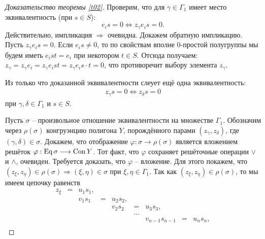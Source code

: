 \documentclass[a4paper]{article}
\newcommand{\Con}{\textnormal{Con}\, }
\newcommand{\Eq}{\textnormal{Eq}\, }
\begin{document}
\begin{proof}[Доказательство теоремы \ref{t02}]
		\par Проверим, что для $\gamma \in \Gamma_1$ имеет место эквивалентность (при $s \in S$): $$ e_i s = 0 \Leftrightarrow z_\gamma e_is = 0. $$ Действительно, импликация $ \Rightarrow $ очевидна. Докажем обратную импликацию. Пусть $z_\gamma e_is = 0$. Если $e_is \neq 0$, то по свойствам вполне 0-простой полугруппы мы будем иметь $e_i st = e_i$ при некотором $t \in S$. Отсюда получаем: $z_\gamma = z_\gamma e_i = z_\gamma e_ist = z_\gamma e_is \cdot t = 0$, что противоречит выбору элемента $z_\gamma$.
		\par Из только что доказанной эквивалентности слеует ещё одна эквивалентность:
		\begin{gather}
			z_\gamma s = 0 \Leftrightarrow z_\delta s = 0 \label{lf1}
		\end{gather}
		при $\gamma,\delta \in \Gamma_1$ и $s \in S$.
		\par Пусть $\sigma$ -- произвольное отношение эквивалентности на множестве $\Gamma_1$. Обозначим через $\rho(\sigma)$ конгруэнцию полигона $Y$, порождённого парами $(z_\gamma, z_\delta)$, где $(\gamma,\delta) \in \sigma$. Докажем, что отображение $\varphi:\sigma \rightarrow \rho(\sigma)$ является вложением решёток $\varphi:\Eq \sigma \longrightarrow \Con Y$. Тот факт, что $\varphi$ сохраняет решёточные операции $\vee$ и $\wedge$, очевиден. Требуется доказать, что $\varphi$ -- вложение. Для этого покажем, что $(z_\xi,z_\eta) \in \rho(\sigma) \Rightarrow (\xi,\eta) \in \sigma$ при $\xi,\eta \in \Gamma_1$. Так как $(z_\xi,z_\eta) \in \rho(\sigma)$, то мы имеем цепочку равенств
		\[ \begin{array}{cccccccccccc}
		    z_\xi & = & u_1s_1, \\
		     & & v_1s_1 & = & u_2s_2, \\
		     & & & & v_2s_2 & = & u_3s_3, \\
		     & & & & & \ldots \\
		     & & & & & & v_{n-1}s_{n-1} & = & u_ns_n, \\

\end{array}\]
\end{proof}
\end{document}
